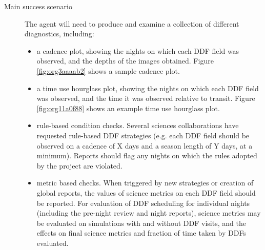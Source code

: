 \begin{description}
\item[{Main success scenario}] The agent will need to produce and examine a collection of different diagnostics, including:
\begin{itemize}
\item a cadence plot, showing the nights on which each DDF field was observed, and the depths of the images obtained. Figure \ref{fig:org3aaaab2} shows a sample cadence plot.
\item a time use hourglass plot, showing the nights on which each DDF field was observed, and the time it was observed relative to transit. Figure \ref{fig:org11a0f88} shows an example time use hourglass plot.
\item rule-based condition checks. Several sciences collaborations have requested rule-based DDF strategies (e.g. each DDF field should be observed on a cadence of X days and a season length of Y days, at a minimum). Reports should flag any nights on which the rules adopted by the project are violated.
\item metric based checks. When triggered by new strategies or creation of global reports, the values of science metrics on each DDF field should be reported. For evaluation of DDF scheduling for individual nights (including the pre-night review and night reports), science metrics may be evaluated on simulations with and without DDF visits, and the effects on final science metrics and fraction of time taken by DDFs evaluated.
\end{itemize}
\end{description}
